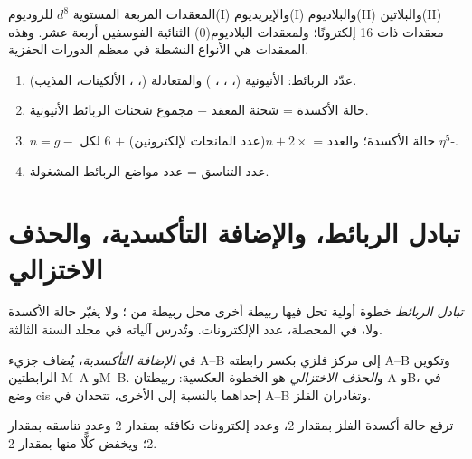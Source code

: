 المعقدات المربعة المستوية $d^8$ للروديوم(I) والإيريديوم(I) والبلاديوم(II) 
والبلاتين(II) معقدات ذات 16 إلكترونًا؛ ولمعقدات البلاديوم(0) الثنائية الفوسفين  أربعة عشر.
وهذه المعقدات هي الأنواع النشطة في معظم الدورات الحفزية.

\begin{method}\label{met:b2:catalytic-cycles:count-organometallic}
\begin{enumerate}
  \item عدّد الربائط: الأنيونية (، ، ، ) والمتعادلة
        (، ، الألكينات، المذيب).
  \item حالة الأكسدة = شحنة المعقد $-$ مجموع شحنات الربائط الأنيونية.
  \item $n = g -$ حالة الأكسدة؛ والعدد = $n + 2 \times$(عدد المانحات لإلكترونين)
        $+$ 6 لكل $\eta^5$-.
  \item عدد التناسق = عدد مواضع الربائط المشغولة.
\end{enumerate}
\end{method}

\section{تبادل الربائط، والإضافة التأكسدية، والحذف الاختزالي}

\begin{definition}\label{def:b2:catalytic-cycles:ligand-exchange}
\emph{تبادل الربائط} خطوة أولية تحل فيها ربيطة أخرى محل ربيطة من
؛ ولا يغيّر حالة الأكسدة
ولا، في المحصلة، عدد الإلكترونات. وتُدرس آلياته في مجلد السنة الثالثة.
\end{definition}

\begin{definition}\label{def:b2:catalytic-cycles:oxidative-addition}
في \emph{الإضافة التأكسدية}، يُضاف جزيء A--B إلى
مركز فلزي بكسر رابطته A--B وتكوين الرابطتين M--A وM--B. 
و\emph{الحذف الاختزالي} هو الخطوة العكسية: ربيطتان
A وB، في وضع cis إحداهما بالنسبة إلى الأخرى، تتحدان في A--B وتغادران الفلز.
\end{definition}

\begin{proposition}\label{prop:b2:catalytic-cycles:oa}
ترفع  حالة أكسدة الفلز بمقدار 2، وعدد إلكترونات تكافئه
بمقدار 2 وعدد تناسقه بمقدار 2؛ ويخفض  كلًّا منها بمقدار 2.
\end{proposition}

